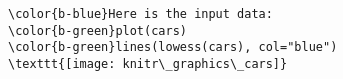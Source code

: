 \documentclass[class=minimal,border=0]{standalone}
\begin{document}
%
\begin{BVerbatim}[bgcolor=b-darkgrey]
\color{b-blue}Here is the input data:
\color{b-green}plot(cars)
\color{b-green}lines(lowess(cars), col="blue")
\texttt{[image: knitr\_graphics\_cars]}
\end{BVerbatim}
\end{document}
